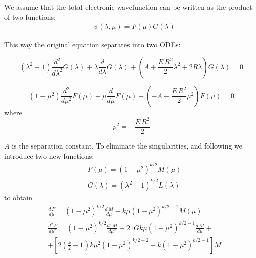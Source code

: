 We assume that the total electronic wavefunction can be written as the product of two functions:
\begin{equation}\label{variables2}
\begin{split}
& \psi(\lambda,\mu) = F(\mu)G(\lambda)
\end{split}
\end{equation}

This way the original equation separates into two ODEs:

\begin{equation}\label{L2-1}
\left(\lambda^2 - 1 \right) \frac{d^2}{ d\lambda^2 }G(\lambda) + \lambda\frac{ d}{d\lambda }G (\lambda)  + \left(A + \frac{E\,R^2}{2}\lambda^2 + 2R\lambda  \right)G (\lambda) = 0  
\end{equation}

\begin{equation}
 \left(1 - \mu^2 \right) \frac{d^2}{ d\mu^2 }F(\mu) - \mu\frac{ d }{d\mu }F(\mu) +  \left(-A -  \frac{E\,R^2}{2}\mu^2  \right)F(\mu) = 0
\end{equation}
where
\begin{equation}\label{eqP}
p^2 = -\frac{E\,R^2}{2}
\end{equation}

$ A $ is the separation constant.  To eliminate the singularities, and following \cite{H2Plus2d1} we introduce two new functions:
\begin{equation}\label{eqNew}
\begin{split}
& F(\mu) = (1-\mu^2)^{k/2}M(\mu) \\[.8em]
& G(\lambda) = (\lambda^2-1)^{k/2}L(\lambda)
\end{split}
\end{equation}
to obtain
\begin{equation}
\begin{split}
& \frac{d\,F}{d\mu} =  (1-\mu^2)^{k/2}\frac{d\,M}{d\mu} - k\mu(1-\mu^2)^{k/2-1}M(\mu) \\[.8em]
& \frac{d^2\,F}{d\mu^2} =  (1-\mu^2)^{k/2}\frac{d^2\,M}{d\mu^2} - 21Gk\mu(1-\mu^2)^{k/2-1}\frac{d\,M}{d\mu} + \\[.8em]
& + \left[2\left(\frac{k}{2}-1\right)k\mu^2\left(1-\mu^2\right)^{k/2-2} - k(1 - \mu^2)^{k/2-1}\right]M
\end{split}
\end{equation}

